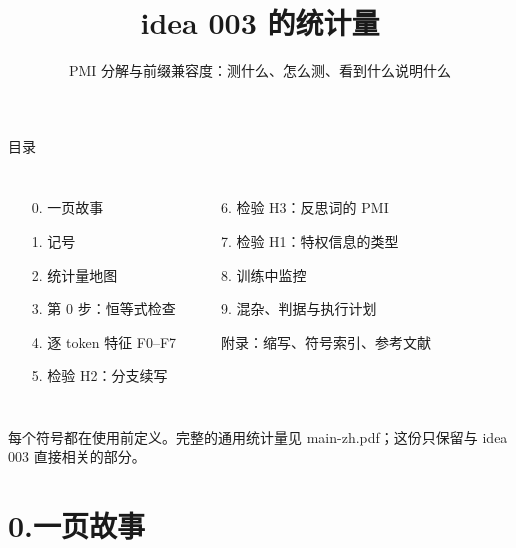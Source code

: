 \documentclass[aspectratio=169,11pt]{beamer}
\title{idea 003 的统计量}
\subtitle{PMI 分解与前缀兼容度：测什么、怎么测、看到什么说明什么}
\author{}
\date{}
\newcommand{\gnote}[1]{{\scriptsize\color{cGray}#1}}
\begin{document}
\maketitle

\begin{frame}{目录}
\begin{columns}[T]
\begin{enumerate}
  \setlength\itemsep{2pt}
  \item[0.] 一页故事
  \item[1.] 记号
  \item[2.] 统计量地图
  \item[3.] 第 0 步：恒等式检查
  \item[4.] 逐 token 特征 F0--F7
  \item[5.] 检验 H2：分支续写
\end{enumerate}
\begin{enumerate}
  \setlength\itemsep{2pt}
  \item[6.] 检验 H3：反思词的 PMI
  \item[7.] 检验 H1：特权信息的类型
  \item[8.] 训练中监控
  \item[9.] 混杂、判据与执行计划
  \item[] 附录：缩写、符号索引、参考文献
\end{enumerate}
\end{columns}
\vspace{10pt}
\gnote{每个符号都在使用前定义。完整的通用统计量见 main-zh.pdf；这份只保留与 idea 003 直接相关的部分。}
\end{frame}

\section{0.\quad 一页故事}
\end{document}
